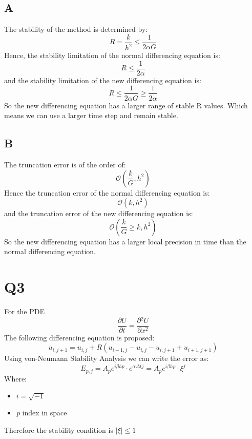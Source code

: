 \documentclass[11pt, a4paper]{article}
\newcommand{\parder}[2]{\frac{\partial {#1}}{\partial {#2}}}
\begin{document}
\subsection{A}
The stability of the method is determined by:
\begin{equation}
    \displaystyle R=\frac{k}{h^2}\le\frac{1}{2\alpha G}
\end{equation}
Hence, the stability limitation of the normal differencing equation is: 
\begin{equation}
    \displaystyle R\le\frac{1}{2\alpha}
\end{equation}
and the stability limitation of the new differencing equation is:
\begin{equation}
    \displaystyle R\le\frac{1}{2\alpha G}\ge\frac{1}{2\alpha}
\end{equation}
So the new differencing equation has a larger range of stable R values. Which means we can use a larger time step and remain stable.
\subsection{B}
The truncation error is of the order of:
\begin{equation}
    \mathcal{O}\left(\frac{k}{G},h^2\right)
\end{equation}
Hence the truncation error of the normal differencing equation is:
\begin{equation}
    \mathcal{O}\left(k,h^2\right)
\end{equation}
and the truncation error of the new differencing equation is:
\begin{equation}
    \mathcal{O}\left(\frac{k}{G}\ge k,h^2\right)
\end{equation}
So the new differencing equation has a larger local precision in time than the normal differencing equation.

\section{Q3}
For the PDE
\begin{equation}
    \parder{U}{t}=\parder{^2U}{x^2}
\end{equation}
The following differencing equation is proposed:
\begin{equation}
    u_{i,j+1}=u_{i,j}+R\left(u_{i-1,j}-u_{i,j}-u_{i,j+1}+u_{i+1,j+1}\right)
\end{equation}
Using von-Neumann Stability Analysis we can write the error as:
\begin{equation}
    E_{p,j}=A_pe^{i\beta h p}\cdot e^{\alpha\Delta tj}=A_pe^{i\beta h p}\cdot\xi^j
\end{equation}
Where:
\begin{itemize}
    \item $i=\sqrt{-1}$
    \item \emph{p} index in space
\end{itemize}
Therefore the stability condition is $\left|\xi\right|\le1$ \\
\end{document}
